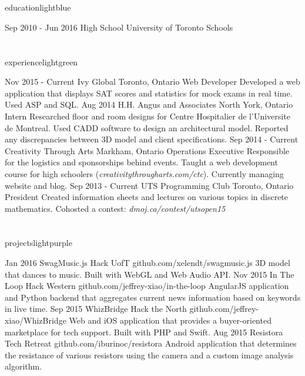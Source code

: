 \documentclass{resume}
\begin{document}
	\begin{main}
		\vspace{10pt}%
		\section{\faBook}{education}{lightblue}
			\begin{entrylist}
				\rightentry%
				{Sep 2010 - Jun 2016}%
				{High School}%
				{University of Toronto Schools}%
				{}{}
			\end{entrylist}
		\section{\faBriefcase}{experience}{lightgreen}
			\begin{entrylist}
				\rightentry%
					{Nov 2015 - Current}%
					{Ivy Global}%
					{Toronto, Ontario}%
					{Web Developer}%
					{Developed a web application that displays SAT scores and statistics for mock exams in real time. Used ASP and SQL.}
				\rightentry%
					{Aug 2014}%
					{H.H. Angus and Associates}%
					{North York, Ontario}%
					{Intern}%
					{Researched floor and room designs for Centre Hospitalier de l'Universite de Montreal. Used CADD software to design an architectural model. Reported any discrepancies between 3D model and client specifications.}
				\rightentry%
					{Sep 2014 - Current}%
					{Creativity Through Arts}%
					{Markham, Ontario}%
					{Operations Executive}%
					{Responsible for the logistics and sponsorships behind events. Taught a web development course for high schoolers (\emph{creativitythrougharts.com/ctc}). Currently managing website and blog.}
				\rightentry%
					{Sep 2013 - Current}%
					{UTS Programming Club}%
					{Toronto, Ontario}%
					{President}%
					{Created information sheets and lectures on various topics in discrete mathematics. Cohosted a contest: \emph{dmoj.ca/contest/utsopen15}}
			\end{entrylist}
		\section{\faFolder}{projects}{lightpurple}
			\begin{entrylist}
				\rightentry%
					{Jan 2016}%
					{SwagMusic.js}%
					{Hack UofT}%
					{github.com/xelendt/swagmusic.js}%
					{3D model that dances to music. Built with WebGL and Web Audio API.}
				\rightentry%
					{Nov 2015}%
					{In The Loop}%
					{Hack Western}%
					{github.com/jeffrey-xiao/in-the-loop}%
					{AngularJS application and Python backend that aggregates current news information based on keywords in live time.}
				\rightentry%
					{Sep 2015}%
					{WhizBridge}%
					{Hack the North}%
					{github.com/jeffrey-xiao/WhizBridge}%
					{Web and iOS application that provides a buyer-oriented marketplace for tech support. Built with PHP and Swift.}
				\rightentry%
					{Aug 2015}%
					{Resistora}%
					{Tech Retreat}%
					{github.com/iburinoc/resistora}%
					{Android application that determines the resistance of various resistors using the camera and a custom image analysis algorithm.}
			\end{entrylist}	
	\end{main}
\end{document}
